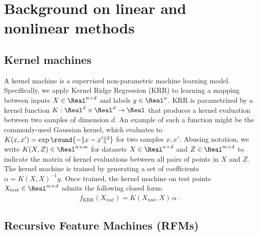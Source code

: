 \section{Background on linear and nonlinear methods}
\label{app: rfms}

\subsection{Kernel machines}
A kernel machine is a supervised non-parametric machine learning model. Specifically, we apply Kernel Ridge Regression (KRR) to learning a mapping between inputs $X \in \Real^{n \times d}$ and labels $y \in \Real^n$. KRR is parametrized by a kernel function $K : \Real^{d} \times \Real^{d} \rightarrow \Real$ that produces a kernel evaluation between two samples of dimension $d$. An example of such a function might be the commonly-used Gaussian kernel, which evaluates to $K(x,x') = \exp\round{-\|x-x'\|^2}$ for two samples $x,x'$. Abusing notation, we write $K(X,Z) \in \Real^{n \times m}$ for datasets $X \in \Real^{n \times d}$ and $Z \in \Real^{m \times d}$ to indicate the matrix of kernel evaluations between all pairs of points in $X$ and $Z$. The kernel machine is trained by generating a set of coefficients $\alpha = K(X,X)^{-1} y$. Once trained, the kernel machine on test points $X_{\mathrm{test}} \in \Real^{m \times d}$ admits the following closed form:
\begin{align*}
    f_{\mathrm{KRR}}(X_{\mathrm{test}} ) = K(X_{\mathrm{test}},X)\, \alpha~. 
\end{align*}

\subsection{Recursive Feature Machines (RFMs)}

